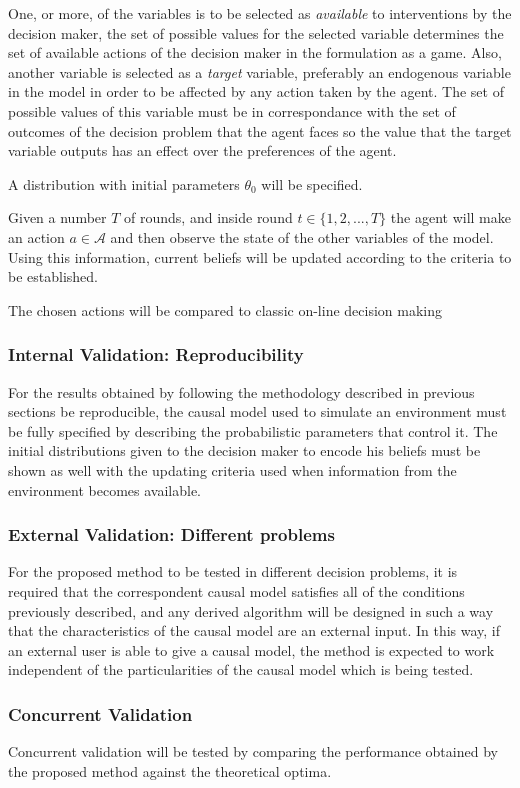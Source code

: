\documentclass[english,letterpaper,12pt,final]{article}
\theoremstyle{definition}
\begin{document}
One, or more, of the variables is to be selected as \textit{available} to interventions by the decision maker, the set of possible values for the selected variable determines the set of available actions of the decision maker in the formulation as a game. Also, another variable is selected as a \textit{target} variable, preferably an endogenous variable in the model in order to be affected by any action taken by the agent. The set of possible values of this variable must be in correspondance with the set of outcomes of the decision problem that the agent faces so the value that the target variable outputs has an effect over the preferences of the agent. 

A distribution with initial parameters $\theta_0$ will be specified. 

Given a number $T$ of rounds, and inside round $t \in \{1,2,...,T \}$ the agent will make an action $a \in \mathcal{A}$ and then observe the state of the other variables of the model. Using this information, current beliefs will be updated according to the criteria to be established.  

The chosen actions will be compared to classic on-line decision making 
\subsubsection{Internal Validation: Reproducibility}
For the results obtained by following the methodology described in previous sections be reproducible, the causal model used to simulate an environment must be fully specified by describing the probabilistic parameters that control it. The initial distributions given to the decision maker to encode his beliefs must be shown as well with the updating criteria used when information from the environment becomes available. 
\subsubsection{External Validation: Different problems}
For the proposed method to be tested in different decision problems, it is required that the correspondent causal model satisfies all of the conditions previously described, and any derived algorithm will be designed in such a way that the characteristics of the causal model are an external input. In this way, if an external user is able to give a causal model, the method is expected to work independent of the particularities of the causal model which is being tested.
\subsubsection{Concurrent Validation}
Concurrent validation will be tested by comparing the performance obtained by the proposed method against the theoretical optima.
\end{document}
